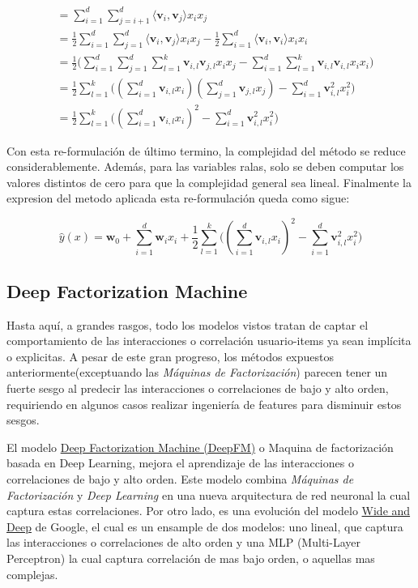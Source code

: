 \documentclass[11pt,a4paper,twoside]{thesis}
\begin{document}
\begin{equation*}
\begin{split}
&=\sum_{i=1}^d \sum_{j=i+1}^d \langle\mathbf{v}_i, \mathbf{v}_j\rangle x_i x_j \\
&= \frac{1}{2} \sum_{i=1}^d \sum_{j=1}^d\langle\mathbf{v}_i, \mathbf{v}_j\rangle x_i x_j - \frac{1}{2}\sum_{i=1}^d \langle\mathbf{v}_i, \mathbf{v}_i\rangle x_i x_i \\
&= \frac{1}{2} \big (\sum_{i=1}^d \sum_{j=1}^d \sum_{l=1}^k\mathbf{v}_{i, l} \mathbf{v}_{j, l} x_i x_j - \sum_{i=1}^d \sum_{l=1}^k \mathbf{v}_{i, l} \mathbf{v}_{i, l} x_i x_i \big)\\
&=  \frac{1}{2} \sum_{l=1}^k \big ((\sum_{i=1}^d \mathbf{v}_{i, l} x_i) (\sum_{j=1}^d \mathbf{v}_{j, l}x_j) - \sum_{i=1}^d \mathbf{v}_{i, l}^2 x_i^2 \big ) \\
&= \frac{1}{2} \sum_{l=1}^k \big ((\sum_{i=1}^d \mathbf{v}_{i, l} x_i)^2 - \sum_{i=1}^d \mathbf{v}_{i, l}^2 x_i^2)
\end{split}
\end{equation*}

Con esta re-formulación de último termino, la complejidad del método se reduce considerablemente. Además, para las variables ralas, solo se deben computar los valores distintos de cero para que la complejidad general sea lineal. Finalmente la expresion del metodo aplicada esta re-formulación queda como sigue:

\begin{equation*}
	\hat{y}(x) = \mathbf{w}_0 + \sum_{i=1}^d \mathbf{w}_i x_i + \frac{1}{2} \sum_{l=1}^k \big ((\sum_{i=1}^d \mathbf{v}_{i, l} x_i)^2 - \sum_{i=1}^d \mathbf{v}_{i, l}^2 x_i^2)
\end{equation*}


\subsection{Deep Factorization Machine}

Hasta aquí, a grandes rasgos, todo los modelos vistos tratan de captar el comportamiento de las interacciones o correlación usuario-items ya sean implícita o explicitas. A pesar de este gran progreso, los métodos expuestos anteriormente(exceptuando las \textit{Máquinas de Factorización}) parecen tener un fuerte sesgo al predecir las interacciones o correlaciones de bajo y alto orden, requiriendo en algunos casos realizar ingeniería de features para disminuir estos sesgos. 

El modelo \href{https://arxiv.org/pdf/1703.04247.pdf}{Deep Factorization Machine (DeepFM)} o Maquina de factorización basada en Deep Learning, mejora el aprendizaje de las interacciones o correlaciones de bajo y alto orden. Este modelo combina \textit{Máquinas de Factorización} y \textit{Deep Learning} en una nueva arquitectura de red neuronal la cual captura estas correlaciones. Por otro lado, es una evolución del modelo \href{https://arxiv.org/pdf/1606.07792.pdf}{Wide and Deep} de Google, el cual es un ensample de dos modelos: uno lineal, que captura las interacciones o correlaciones de alto orden y una MLP (Multi-Layer Perceptron) la cual captura correlación de mas bajo orden, o aquellas mas complejas.
\end{document}
